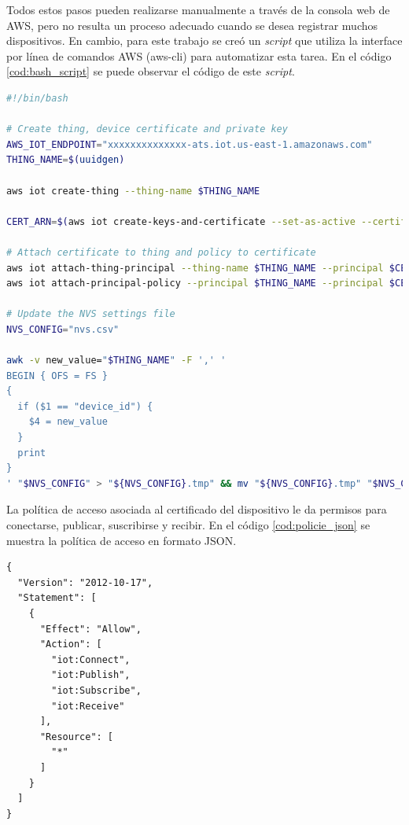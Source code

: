 Todos estos pasos pueden realizarse manualmente a través de la consola web de AWS, pero no resulta un proceso adecuado cuando se desea registrar muchos dispositivos. En cambio, para este trabajo se creó un \textit{script} que utiliza la interface por línea de comandos AWS (aws-cli) \cite{awscli_info} para automatizar esta tarea. En el código \ref{cod:bash_script} se puede observar el código de este \textit{script}.

\begin{lstlisting}[language=bash, label=cod:bash_script, caption=\textit{Script} para automatizar el registro de un dispositivo en AWS IoT Core]
#!/bin/bash

# Create thing, device certificate and private key
AWS_IOT_ENDPOINT="xxxxxxxxxxxxxx-ats.iot.us-east-1.amazonaws.com"
THING_NAME=$(uuidgen)

aws iot create-thing --thing-name $THING_NAME

CERT_ARN=$(aws iot create-keys-and-certificate --set-as-active --certificate-pem-outfile device.pem.crt --private-key-outfile private.pem.key --query 'certificateArn' --output text)

# Attach certificate to thing and policy to certificate
aws iot attach-thing-principal --thing-name $THING_NAME --principal $CERT_ARN
aws iot attach-principal-policy --principal $THING_NAME --principal $CERT_ARN --policy-name IOT_ACCESS

# Update the NVS settings file
NVS_CONFIG="nvs.csv"

awk -v new_value="$THING_NAME" -F ',' '
BEGIN { OFS = FS }
{
  if ($1 == "device_id") {
    $4 = new_value
  }
  print
}
' "$NVS_CONFIG" > "${NVS_CONFIG}.tmp" && mv "${NVS_CONFIG}.tmp" "$NVS_CONFIG"
\end{lstlisting}

La política de acceso asociada al certificado del dispositivo le da permisos para conectarse, publicar, suscribirse y recibir. En el código \ref{cod:policie_json} se muestra la política de acceso en formato JSON.

\begin{lstlisting}[label=cod:policie_json,caption=Politica de acceso asociada a los certificados de los dispositivos.]
{
  "Version": "2012-10-17",
  "Statement": [
    {
      "Effect": "Allow",
      "Action": [
        "iot:Connect",
        "iot:Publish",
        "iot:Subscribe",
        "iot:Receive"
      ],
      "Resource": [
        "*"
      ]
    }
  ]
}
\end{lstlisting}

